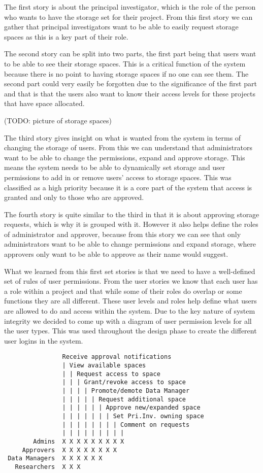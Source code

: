 \documentclass[a4paper,titlepage,12pt]{article}
\begin{document}
The first story is about the principal investigator, which is the role of the
person who wants to have the storage set for their project. From this first
story we can gather that principal investigators want to be able to easily
request storage spaces as this is a key part of their role.

The second story can be split into two parts, the first part being that users
want to be able to see their storage spaces. This is a critical function of the
system because there is no point to having storage spaces if no one can see
them. The second part could very easily be forgotten due to the significance of
the first part and that is that the users also want to know their access levels
for these projects that have space allocated.

(TODO: picture of storage spaces)

The third story gives insight on what is wanted from the system in terms of
changing the storage of users. From this we can understand that administrators
want to be able to change the permissions, expand and approve storage. This
means the system needs to be able to dynamically set storage and user
permissions to add in or remove users' access to storage spaces. This was
classified as a high priority because it is a core part of the system that
access is granted and only to those who are approved.

The fourth story is quite similar to the third in that it is about approving
storage requests, which is why it is grouped with it. However it also helps
define the roles of administrator and approver, because from this story we can
see that only administrators want to be able to change permissions and expand
storage, where approvers only want to be able to approve as their name would
suggest.

What we learned from this first set stories is that we need to have a
well-defined set of rules of user permissions. From the user stories we know
that each user has a role within a project and that while some of their roles
do overlap or some functions they are all different. These user levels and
roles help define what users are allowed to do and access within the system.
Due to the key nature of system integrity we decided to come up with a diagram
of user permission levels for all the user types. This was used throughout the
design phase to create the different user logins in the system.

\begin{lstlisting}
                Receive approval notifications
                | View available spaces
                | | Request access to space
                | | | Grant/revoke access to space
                | | | | Promote/demote Data Manager
                | | | | | Request additional space
                | | | | | | Approve new/expanded space
                | | | | | | | Set Pri.Inv. owning space
                | | | | | | | | Comment on requests
                | | | | | | | | |
        Admins  X X X X X X X X X
     Approvers  X X X X X X X X
 Data Managers  X X X X X X
   Researchers  X X X
\end{lstlisting}
\end{document}
